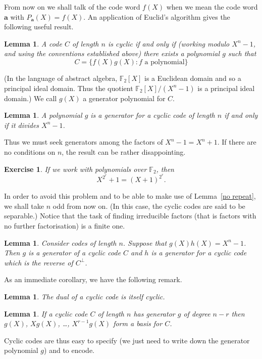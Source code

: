 \documentclass[12pt,a4paper]{article}
\theoremstyle{plain}
\newtheorem{lemma}[theorem]{Lemma}
\newtheorem{exercise}[theorem]{Exercise}
\theoremstyle{definition}
\begin{document}
From now on we shall talk of the code word $f(X)$
when we mean the code word ${\mathbf a}$ with
$P_{\mathbf a}(X)=f(X)$. An application
of Euclid's algorithm gives the following useful
result.
\begin{lemma} A code $C$ of length $n$ is
cyclic if and only if (working modulo
$X^{n}-1$, and using the conventions established
above) there exists a polynomial $g$ such that
\[C=\{f(X)g(X):\text{$f$ a polynomial}\}\]
\end{lemma}

\noindent (In the language of abstract algebra,
${\mathbb F}_{2}[X]$ is a Euclidean domain
and so a principal ideal domain. Thus the
quotient ${\mathbb F}_{2}[X]/(X^{n}-1)$ is
a principal ideal domain.) We call $g(X)$
a generator polynomial for $C$.

\begin{lemma} A polynomial $g$ is a generator
for a cyclic code of length $n$ if and
only if it divides $X^{n}-1$.
\end{lemma}
Thus we must seek generators among the
factors of $X^{n}-1=X^{n}+1$.
If there are no conditions on $n$,
the result can be rather disappointing.
\begin{exercise} If we work with polynomials over
${\mathbb F}_{2}$, then
\[X^{2^{r}}+1=(X+1)^{2^{r}}.\]
\end{exercise}

In order to avoid this problem
and to be able to make use of
Lemma~\ref{no repeat}, we shall
take $n$ odd from now on. (In this case,
the cyclic codes are said to be separable.)
Notice that the task of finding
irreducible factors  (that is factors with
no further factorisation) is a finite one.

\begin{lemma} Consider codes of length $n$.
Suppose that $g(X)h(X)=X^{n}-1$. Then $g$
is a generator of a cyclic code $C$
and $h$ is a generator for a cyclic code
which is the reverse of $C^{\perp}$.
\end{lemma}
As an immediate corollary, we have the following
remark.
\begin{lemma} The dual of a cyclic code
is itself cyclic.
\end{lemma}
\begin{lemma}\label{cyclic basis}
If a cyclic code $C$ of length
$n$ has generator $g$ of degree $n-r$ then
$g(X)$, $Xg(X)$, \dots, $X^{r-1}g(X)$
form a basis for $C$.
\end{lemma}
Cyclic codes are thus easy to specify
(we just need to write down the generator
polynomial $g$) and to encode.
\end{document}
